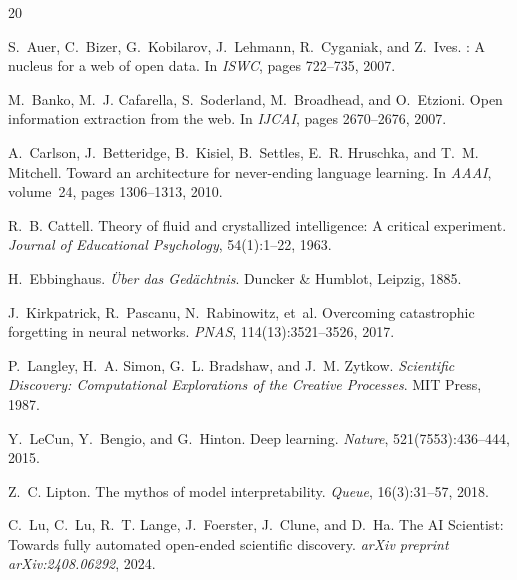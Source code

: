 \documentclass[11pt,twocolumn]{article}
\begin{document}

\begin{thebibliography}{20}

S.~Auer, C.~Bizer, G.~Kobilarov, J.~Lehmann, R.~Cyganiak, and Z.~Ives.
: A nucleus for a web of open data.
\newblock In \emph{ISWC}, pages 722--735, 2007.

M.~Banko, M.~J. Cafarella, S.~Soderland, M.~Broadhead, and O.~Etzioni.
\newblock Open information extraction from the web.
\newblock In \emph{IJCAI}, pages 2670--2676, 2007.

A.~Carlson, J.~Betteridge, B.~Kisiel, B.~Settles, E.~R. Hruschka, and T.~M. Mitchell.
\newblock Toward an architecture for never-ending language learning.
\newblock In \emph{AAAI}, volume~24, pages 1306--1313, 2010.

R.~B. Cattell.
\newblock Theory of fluid and crystallized intelligence: A critical experiment.
\newblock \emph{Journal of Educational Psychology}, 54(1):1--22, 1963.

H.~Ebbinghaus.
\newblock \emph{{\"U}ber das Ged{\"a}chtnis}.
\newblock Duncker \& Humblot, Leipzig, 1885.

J.~Kirkpatrick, R.~Pascanu, N.~Rabinowitz, et~al.
\newblock Overcoming catastrophic forgetting in neural networks.
\newblock \emph{PNAS}, 114(13):3521--3526, 2017.

P.~Langley, H.~A. Simon, G.~L. Bradshaw, and J.~M. Zytkow.
\newblock \emph{Scientific Discovery: Computational Explorations of the Creative Processes}.
\newblock MIT Press, 1987.

Y.~LeCun, Y.~Bengio, and G.~Hinton.
\newblock Deep learning.
\newblock \emph{Nature}, 521(7553):436--444, 2015.

Z.~C. Lipton.
\newblock The mythos of model interpretability.
\newblock \emph{Queue}, 16(3):31--57, 2018.

C.~Lu, C.~Lu, R.~T. Lange, J.~Foerster, J.~Clune, and D.~Ha.
\newblock The {AI} Scientist: Towards fully automated open-ended scientific discovery.
\newblock \emph{arXiv preprint arXiv:2408.06292}, 2024.


\end{thebibliography}
\end{document}
